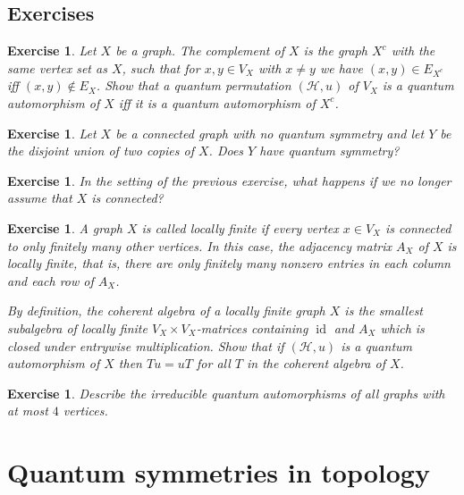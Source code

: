 \documentclass[a4paper]{amsart}
\newcommand*{\Hc}{\mathcal{H}}
\DeclareMathOperator{\id}{id}
\numberwithin{equation}{section}
\theoremstyle{change}
\newtheorem{exercise}[theorem]{Exercise}
\begin{document}
\subsection{Exercises}

\begin{exercise}
Let $ X $ be a graph. The complement of $ X $ is the graph $ X^c $  with the same vertex set as $ X $, such that for $ x,y \in V_X $ with $ x \neq y $ we have $ (x,y) \in E_{X^c} $ iff $ (x,y) \notin E_X $. 
Show that a quantum permutation $ (\Hc,u) $ of $ V_X $ is a quantum automorphism of $ X $ iff it is a quantum automorphism of $ X^c $. 
\end{exercise}

\begin{exercise}
Let $ X $ be a connected graph with no quantum symmetry and let $ Y $ be the disjoint union of two copies of $ X $. Does $ Y $ have quantum symmetry? 
\end{exercise}

\begin{exercise}
In the setting of the previous exercise, what happens if we no longer assume that $ X $ is connected? 
\end{exercise}

\begin{exercise} 
A graph $ X $ is called locally finite if every vertex $ x \in V_X $ is connected to only finitely many other vertices. In this case, the adjacency matrix $ A_X $ of $ X $ is locally finite, that is, there are only finitely many nonzero entries in each column and each row of $ A_X $. 

By definition, the coherent algebra of a locally finite graph $ X $ is the smallest 
subalgebra of locally finite $ V_X \times V_X $-matrices containing $ \id $ and $ A_X $ which is closed under entrywise multiplication. 
Show that if $ (\Hc, u) $ is a quantum automorphism of $ X $ then $ T u = u T $ for all $ T $ in the coherent algebra of $ X $. 
\end{exercise}

\begin{exercise}
Describe the irreducible quantum automorphisms of all graphs with at most $ 4 $ vertices. 
\end{exercise}


\section{Quantum symmetries in topology} 
\end{document}
